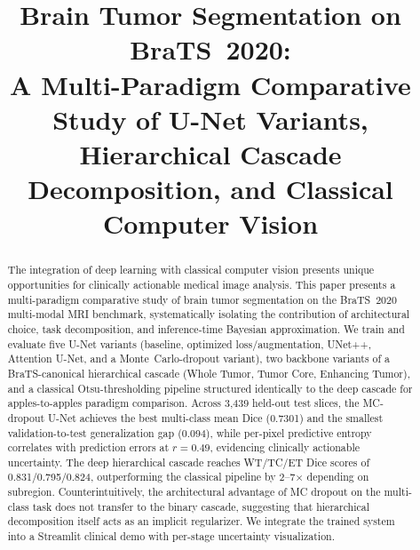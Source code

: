 \documentclass[conference]{IEEEtran}
\begin{document}
\title{Brain Tumor Segmentation on BraTS~2020: \\
A Multi-Paradigm Comparative Study of U-Net Variants, \\
Hierarchical Cascade Decomposition, and Classical Computer Vision}

\author{
}

\maketitle

\begin{abstract}
The integration of deep learning with classical computer vision presents
unique opportunities for clinically actionable medical image analysis.
This paper presents a multi-paradigm comparative study of brain tumor
segmentation on the BraTS~2020 multi-modal MRI benchmark, systematically
isolating the contribution of architectural choice, task decomposition,
and inference-time Bayesian approximation. We train and evaluate five
U-Net variants (baseline, optimized loss/augmentation, UNet++, Attention
U-Net, and a Monte~Carlo-dropout variant), two backbone variants of a
BraTS-canonical hierarchical cascade (Whole Tumor, Tumor Core, Enhancing
Tumor), and a classical Otsu-thresholding pipeline structured identically
to the deep cascade for apples-to-apples paradigm comparison. Across
3{,}439 held-out test slices, the MC-dropout U-Net achieves the best
multi-class mean Dice (0.7301) and the smallest validation-to-test
generalization gap (0.094), while per-pixel predictive entropy correlates
with prediction errors at $r=0.49$, evidencing clinically actionable
uncertainty. The deep hierarchical cascade reaches WT/TC/ET Dice scores
of 0.831/0.795/0.824, outperforming the classical pipeline by
2--7$\times$ depending on subregion. Counterintuitively, the
architectural advantage of MC dropout on the multi-class task does not
transfer to the binary cascade, suggesting that hierarchical decomposition
itself acts as an implicit regularizer. We integrate the trained system
into a Streamlit clinical demo with per-stage uncertainty visualization.
\end{abstract}
\end{document}
